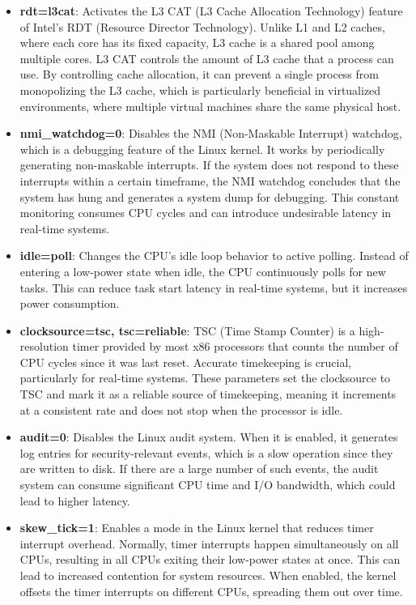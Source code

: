 \documentclass[MMR,Master,english]{style/twbook}
\begin{document}
\begin{itemize}
	\item \textbf{rdt=l3cat}: Activates the L3 CAT (L3 Cache Allocation Technology) feature of Intel's RDT (Resource Director Technology). Unlike L1 and L2 caches, where each core has its fixed capacity, L3 cache is a shared pool among multiple cores. L3 CAT controls the amount of L3 cache that a process can use. By controlling cache allocation, it can prevent a single process from monopolizing the L3 cache, which is particularly beneficial in virtualized environments, where multiple virtual machines share the same physical host.
	\item \textbf{nmi\_watchdog=0}: Disables the NMI (Non-Maskable Interrupt) watchdog, which is a debugging feature of the Linux kernel. It works by periodically generating non-maskable interrupts. If the system does not respond to these interrupts within a certain timeframe, the NMI watchdog concludes that the system has hung and generates a system dump for debugging. This constant monitoring consumes CPU cycles and can introduce undesirable latency in real-time systems.
	\item \textbf{idle=poll}: Changes the CPU's idle loop behavior to active polling. Instead of entering a low-power state when idle, the CPU continuously polls for new tasks. This can reduce task start latency in real-time systems, but it increases power consumption.
	\item \textbf{clocksource=tsc, tsc=reliable}: TSC (Time Stamp Counter) is a high-resolution timer provided by most x86 processors that counts the number of CPU cycles since it was last reset. Accurate timekeeping is crucial, particularly for real-time systems. These parameters set the clocksource to TSC and mark it as a reliable source of timekeeping, meaning it increments at a consistent rate and does not stop when the processor is idle.
	\item \textbf{audit=0}: Disables the Linux audit system. When it is enabled, it generates log entries for security-relevant events, which is a slow operation since they are written to disk. If there are a large number of such events, the audit system can consume significant CPU time and I/O bandwidth, which could lead to higher latency.
	\item \textbf{skew\_tick=1}: Enables a mode in the Linux kernel that reduces timer interrupt overhead. Normally, timer interrupts happen simultaneously on all CPUs, resulting in all CPUs exiting their low-power states at once. This can lead to increased contention for system resources. When enabled, the kernel offsets the timer interrupts on different CPUs, spreading them out over time.

\end{itemize}
\end{document}
